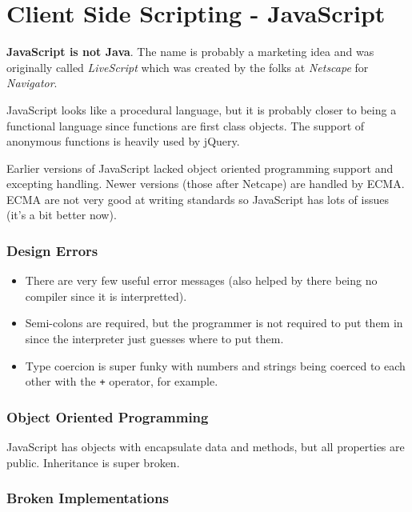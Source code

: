 \section{Client Side Scripting - JavaScript}\label{sec:client_side_scripting}

\textbf{JavaScript is not Java}.
The name is probably a marketing idea and was originally called \emph{LiveScript} which was created by the folks at \emph{Netscape} for \emph{Navigator}.

JavaScript looks like a procedural language, but it is probably closer to being a functional language since functions are first class objects.
The support of anonymous functions is heavily used by jQuery.

Earlier versions of JavaScript lacked object oriented programming support and excepting handling.
Newer versions (those after Netcape) are handled by ECMA.
ECMA are not very good at writing standards so JavaScript has lots of issues (it's a bit better now).

\subsubsection{Design Errors}\label{ssub:design_errors}

\begin{itemize}
    \item There are very few useful error messages (also helped by there being no compiler since it is interpretted).
    \item Semi-colons are required, but the programmer is not required to put them in since the interpreter just guesses where to put them.
    \item Type coercion is super funky with numbers and strings being coerced to each other with the \texttt{+} operator, for example.
\end{itemize}

\subsubsection{Object Oriented Programming}\label{ssub:object_oriented_programming}

JavaScript has objects with encapsulate data and methods, but all properties are public.
Inheritance is super broken.

\subsubsection{Broken Implementations}\label{ssub:broken_implementations}

